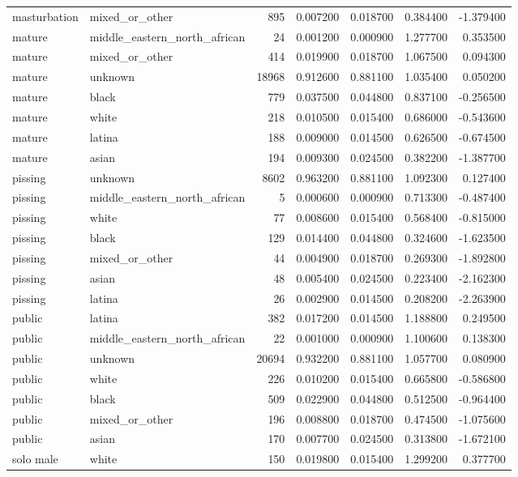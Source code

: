 \begin{tabular}{llrrrrr}
masturbation & mixed_or_other & 895 & 0.007200 & 0.018700 & 0.384400 & -1.379400 \\
mature & middle_eastern_north_african & 24 & 0.001200 & 0.000900 & 1.277700 & 0.353500 \\
mature & mixed_or_other & 414 & 0.019900 & 0.018700 & 1.067500 & 0.094300 \\
mature & unknown & 18968 & 0.912600 & 0.881100 & 1.035400 & 0.050200 \\
mature & black & 779 & 0.037500 & 0.044800 & 0.837100 & -0.256500 \\
mature & white & 218 & 0.010500 & 0.015400 & 0.686000 & -0.543600 \\
mature & latina & 188 & 0.009000 & 0.014500 & 0.626500 & -0.674500 \\
mature & asian & 194 & 0.009300 & 0.024500 & 0.382200 & -1.387700 \\
pissing & unknown & 8602 & 0.963200 & 0.881100 & 1.092300 & 0.127400 \\
pissing & middle_eastern_north_african & 5 & 0.000600 & 0.000900 & 0.713300 & -0.487400 \\
pissing & white & 77 & 0.008600 & 0.015400 & 0.568400 & -0.815000 \\
pissing & black & 129 & 0.014400 & 0.044800 & 0.324600 & -1.623500 \\
pissing & mixed_or_other & 44 & 0.004900 & 0.018700 & 0.269300 & -1.892800 \\
pissing & asian & 48 & 0.005400 & 0.024500 & 0.223400 & -2.162300 \\
pissing & latina & 26 & 0.002900 & 0.014500 & 0.208200 & -2.263900 \\
public & latina & 382 & 0.017200 & 0.014500 & 1.188800 & 0.249500 \\
public & middle_eastern_north_african & 22 & 0.001000 & 0.000900 & 1.100600 & 0.138300 \\
public & unknown & 20694 & 0.932200 & 0.881100 & 1.057700 & 0.080900 \\
public & white & 226 & 0.010200 & 0.015400 & 0.665800 & -0.586800 \\
public & black & 509 & 0.022900 & 0.044800 & 0.512500 & -0.964400 \\
public & mixed_or_other & 196 & 0.008800 & 0.018700 & 0.474500 & -1.075600 \\
public & asian & 170 & 0.007700 & 0.024500 & 0.313800 & -1.672100 \\
solo male & white & 150 & 0.019800 & 0.015400 & 1.299200 & 0.377700 \\

\end{tabular}
